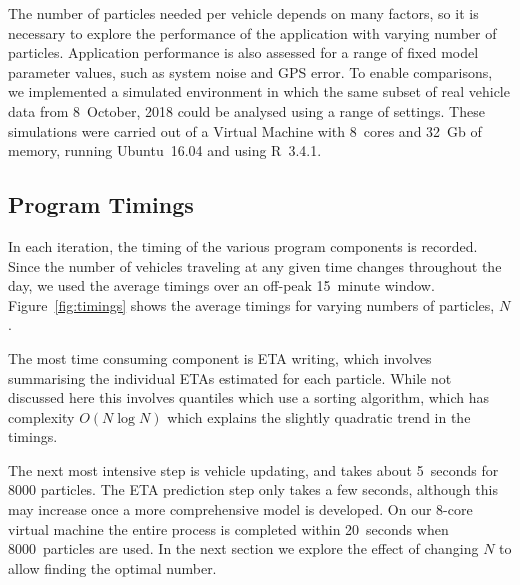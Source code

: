The number of particles needed per vehicle 
depends on many factors,
so it is necessary to explore the performance of the application
with varying number of particles.
Application performance is also assessed
for a range of fixed model parameter values,
such as system noise and GPS error.
To enable comparisons, we implemented a simulated \rt environment
in which the same subset of real vehicle data from 8~October, 2018
could be analysed using a range of settings.
These simulations were carried out of a Virtual Machine 
with 8~cores and 32~Gb of memory, 
running Ubuntu~16.04 and using R~3.4.1.


\subsection{Program Timings}
\label{sec:timings}

In each iteration, 
the timing of the various program components is recorded.
Since the number of vehicles traveling at any given time changes throughout the day,
we used the average timings over an off-peak 15~minute window.
Figure~\ref{fig:timings} shows the average timings for 
varying numbers of particles, $N$.


The most time consuming component is ETA writing,
which involves summarising the individual ETAs estimated for each particle.
While not discussed here this involves quantiles which use a sorting algorithm,
which has complexity $O(N \log N)$ 
which explains the slightly quadratic trend in the timings.


The next most intensive step is vehicle updating,
and takes about 5~seconds for 8000 particles.
The ETA prediction step only takes a few seconds,
although this may increase once a more comprehensive model is developed.
On our 8-core virtual machine the entire process is completed within 20~seconds
when 8000~particles are used.
In the next section we explore the effect of changing $N$
to allow finding the optimal number.


